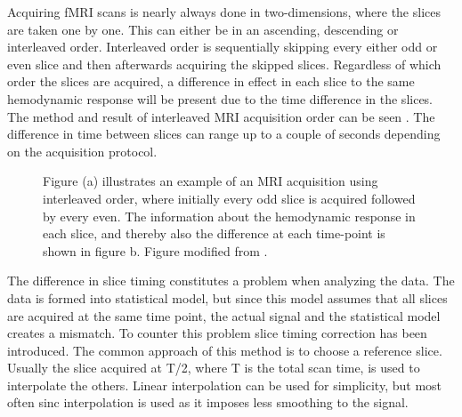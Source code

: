 Acquiring fMRI scans is nearly always done in two-dimensions, where the slices are taken one by one. This can either be in an ascending, descending or interleaved order. Interleaved order  is sequentially skipping every either odd or even slice and then afterwards acquiring the skipped slices. Regardless of which order the slices are acquired, a difference in effect in each slice to the same hemodynamic response will be present due to the time difference in the slices. The method and result of interleaved MRI acquisition order can be seen . The difference in time between slices can range up to a couple of seconds depending on the acquisition protocol. 
\begin{figure}[H] 
	\hspace{0.5cm}
	\hspace{0.5cm}
	\caption{Figure (a) illustrates an example of an MRI acquisition using interleaved order, where initially every odd slice is acquired followed by every even. The information about the hemodynamic response in each slice, and thereby also the difference at each time-point is shown in figure b. Figure modified from \cite{Poldrack2011}.}
	\label{fig:back:interleaved}
\end{figure}

The difference in slice timing constitutes a problem when analyzing the data. The data is formed into statistical model, but since this model assumes that all slices are acquired at the same time point, the actual signal and the statistical model creates a mismatch. To counter this problem slice timing correction has been introduced. The common approach of this method is to choose a reference slice. Usually the slice acquired at T/2, where T is the total scan time, is used to interpolate the others. Linear interpolation can be used for simplicity, but most often sinc interpolation is used as it imposes less smoothing to the signal. \cite{Poldrack2011} 

